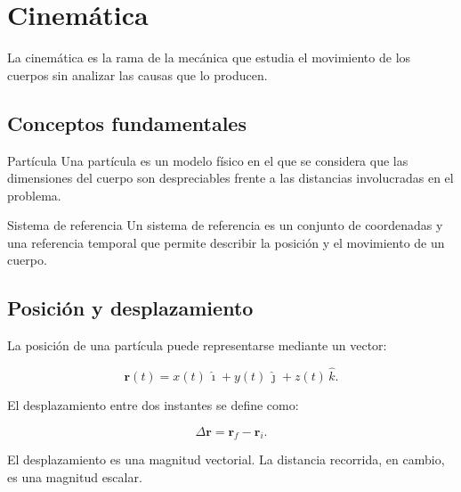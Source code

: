 \documentclass[12pt,oneside]{book}
\newcommand{\vect}[1]{\mathbf{#1}}
\begin{document}

\chapter{Cinemática}

La cinemática es la rama de la mecánica que estudia el
movimiento de los cuerpos sin analizar las causas que lo
producen.

\section{Conceptos fundamentales}

\begin{definition}{Partícula}
Una partícula es un modelo físico en el que se considera que
las dimensiones del cuerpo son despreciables frente a las
distancias involucradas en el problema.
\end{definition}

\begin{definition}{Sistema de referencia}
Un sistema de referencia es un conjunto de coordenadas y una
referencia temporal que permite describir la posición y el
movimiento de un cuerpo.
\end{definition}

\section{Posición y desplazamiento}

La posición de una partícula puede representarse mediante un
vector:

\begin{equation}
    \vect{r}(t) = x(t)\,\hat{\imath}
    + y(t)\,\hat{\jmath}
    + z(t)\,\hat{k}.
    \label{eq:posicion}
\end{equation}

El desplazamiento entre dos instantes se define como:

\begin{equation}
    \Delta \vect{r}
    = \vect{r}_f - \vect{r}_i.
    \label{eq:desplazamiento}
\end{equation}

\begin{important}
El desplazamiento es una magnitud vectorial. La distancia
recorrida, en cambio, es una magnitud escalar.
\end{important}
\end{document}
